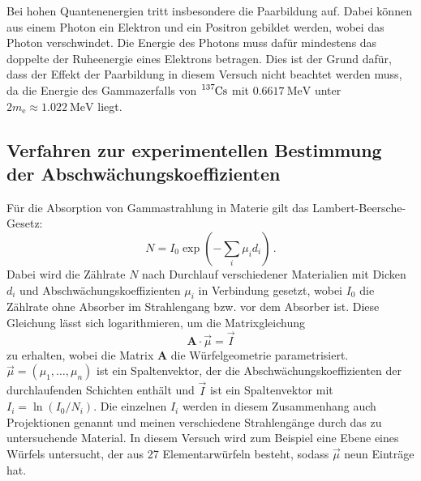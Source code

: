 Bei hohen Quantenenergien tritt insbesondere die Paarbildung auf. Dabei können aus
einem Photon ein Elektron und ein Positron gebildet werden, wobei das
Photon verschwindet. Die Energie des Photons muss dafür mindestens das doppelte
der Ruheenergie eines Elektrons betragen. Dies ist der Grund dafür, dass der Effekt der Paarbildung in diesem Versuch nicht beachtet werden muss, da die Energie des Gammazerfalls von $\ce{^{137}Cs}$ mit $\SI{0.6617}{\mega\electronvolt}$ unter $2m_\text{e} \approx \SI{1.022}{\mega\electronvolt}$ liegt.

%

\subsection{Verfahren zur experimentellen Bestimmung der Abschwächungskoeffizienten}

Für die Absorption von Gammastrahlung in Materie gilt das Lambert-Beersche-Gesetz:
\begin{equation}
	N = I_0 \exp\left(-\sum_i \mu_i d_i\right)\,.
	\label{eqn:lambertBeer}
\end{equation}
Dabei wird die Zählrate $N$ nach Durchlauf verschiedener Materialien mit Dicken $d_i$ und Abschwächungskoeffizienten $\mu_i$ in Verbindung gesetzt, wobei $I_0$ die Zählrate ohne Absorber im Strahlengang bzw. vor dem Absorber ist.
Diese Gleichung lässt sich logarithmieren, um die Matrixgleichung
\begin{equation}
	\symbf{A} \cdot \vec{\mu} = \vec{I}
\end{equation}
zu erhalten, wobei die Matrix $\symbf{A}$ die Würfelgeometrie parametrisiert. $\vec{\mu} = (\mu_1, \dots, \mu_n)$ ist ein Spaltenvektor, der die Abschwächungskoeffizienten der durchlaufenden Schichten enthält und $\vec{I}$ ist ein Spaltenvektor mit $I_i = \ln(I_0/N_i)$. Die einzelnen $I_i$ werden in diesem Zusammenhang auch Projektionen genannt und meinen verschiedene Strahlengänge durch das zu untersuchende Material. In diesem Versuch wird zum Beispiel eine Ebene eines Würfels untersucht, der aus 27 Elementarwürfeln besteht, sodass $\vec{\mu}$ neun Einträge hat.

